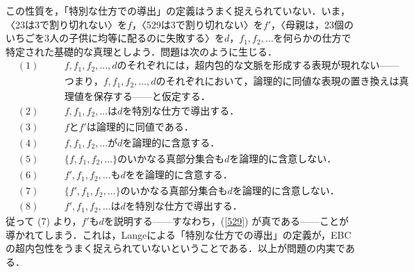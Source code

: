 \documentclass[dvipdfmx,twoside,11pt,uplatex]{jsarticle}
\theoremstyle{definition}
\begin{document}
この性質を，「特別な仕方での導出」の定義はうまく捉えられていない．いま，〈23は3で割り切れない〉を$f$，〈529は3で割り切れない〉を$f'$，〈母親は，23個のいちごを3人の子供に均等に配るのに失敗する〉を$d$，$f_1, f_2, \ldots$を何らかの仕方で特定された基礎的な真理としよう．問題は次のように生じる．
\begin{align*}
    &(1)\quad& &f, f_1, f_2, \ldots, d のそれぞれには，超内包的な文脈を形成する表現が現れない\text{------}\\&&&つまり，f, f_1, f_2, \ldots, d のそれぞれにおいて，論理的に同値な表現の置き換えは真\\&&&理値を保存する\text{------}と仮定する．\\
    &(2)\quad& &f, f_1, f_2, \ldots はdを特別な仕方で導出する．\tag{前提}\\
    &(3)\quad& &fとf'は論理的に同値である．\tag{前提}\\
    &(4)\quad& &f, f_1, f_2, \ldots が d を論理的に含意する．\tag{特別な導出の定義，2より．}\\
    &(5)\quad& &\{f, f_1, f_2, \ldots\} のいかなる真部分集合も d を論理的に含意しない．\tag{特別な導出の定義，2より．}\\
    &(6)\quad& &f', f_1, f_2, \ldots も d をを論理的に含意する．\tag{1, 3, 4より．}\\
    &(7)\quad& &\{f', f_1, f_2, \ldots\} のいかなる真部分集合も d を論理的に含意しない．\tag{1, 3, 4より．}\\
    &(8)\quad& &f', f_1, f_2, \ldots は d を特別な仕方で導出する．\tag{6, 7, 特別な導出の定義より．}
\end{align*}
従って (7) より，$f'$も$d$を説明する------すなわち，(\ref{529}) が真である------ことが導かれてしまう．これは，Langeによる「特別な仕方での導出」の定義が，EBCの超内包性をうまく捉えられていないということである．以上が問題の内実である．
\end{document}
